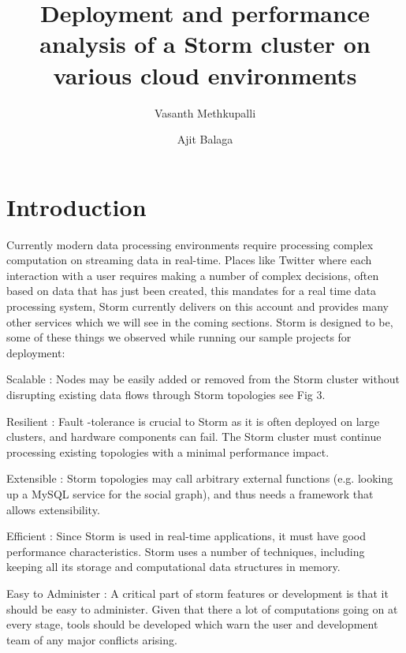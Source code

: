 \documentclass[9pt,twocolumn,twoside]{../../styles/osajnl}
\title{Deployment and performance analysis of a Storm cluster on various cloud environments}
\author[1,*]{Vasanth Methkupalli}
\author[1,**]{Ajit Balaga}
\affil[1]{School of Informatics and Computing, Bloomington, IN 47408, U.S.A.}
\affil[*]{Corresponding authors: mvasanthiiit@gmail.com}
\affil[**]{Corresponding authors: ajit.balaga@gmail.com}
\begin{document}
\maketitle


\maketitle

\section{Introduction}
Currently modern data processing environments require processing
complex computation on streaming data in real-time. Places like
Twitter where each interaction with a user requires making a number of
complex decisions, often based on data that has just been created,
this mandates for a real time data processing system, Storm currently
delivers on this account and provides many other services which we
will see in the coming sections. Storm is designed to be, some of
these things we observed while running our sample projects for
deployment:

\begin{description}
\item Scalable : Nodes may be easily added or removed
  from the Storm cluster without disrupting existing data flows
  through Storm topologies see Fig 3.
\item Resilient : Fault -tolerance is crucial to Storm as it is often
  deployed on large clusters, and hardware components can fail.  The
  Storm cluster must continue processing existing topologies with a
  minimal performance impact.
\item Extensible : Storm topologies may call arbitrary external
  functions (e.g. looking up a MySQL service for the social graph),
  \cite{bronson2013tao} and thus needs a framework that allows
  extensibility.
\item  Efficient : Since Storm is used in
  real-time applications, it must have good performance
  characteristics. Storm uses a number of techniques, including
  keeping all its storage and computational data structures in memory.
\item Easy to Administer : A critical part of storm features or
  development is that it should be easy to administer. Given that
  there a lot of computations going on at every stage, tools should be
  developed which warn the user and development team of any major
  conflicts arising.
\end{description}
\end{document}
